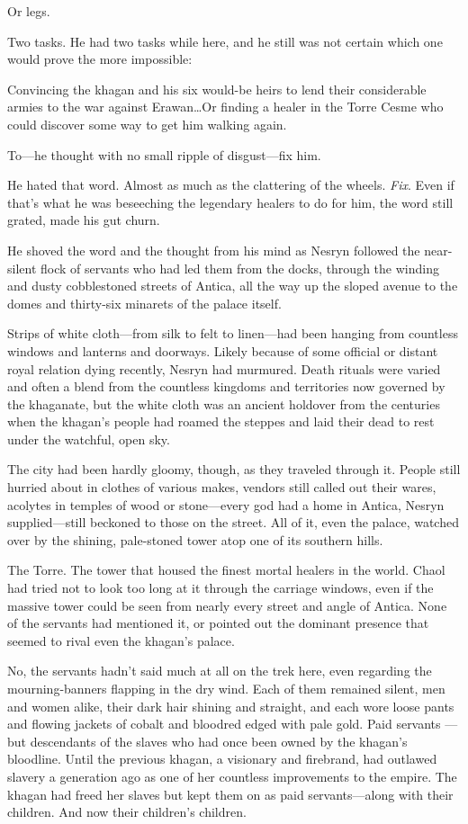 Or legs.

Two tasks.
He had two tasks while here, and he still was not certain which one would prove the more impossible:

Convincing the khagan and his six would-be heirs to lend their considerable armies to the war against Erawan\ldots Or finding a healer in the Torre Cesme who could discover some way to get him walking again.

To---he thought with no small ripple of disgust---fix him.

He hated that word.
Almost as much as the clattering of the wheels.
\emph{Fix}.
Even if that's what he was beseeching the legendary healers to do for him, the word still grated, made his gut churn.

He shoved the word and the thought from his mind as Nesryn followed the near-silent flock of servants who had led them from the docks, through the winding and dusty cobblestoned streets of Antica, all the way up the sloped avenue to the domes and thirty-six minarets of the palace itself.

Strips of white cloth---from silk to felt to linen---had been hanging from countless windows and lanterns and doorways.
Likely because of some official or distant royal relation dying recently, Nesryn had murmured.
Death rituals were varied and often a blend from the countless kingdoms and territories now governed by the khaganate, but the white cloth was an ancient holdover from the centuries when the khagan's people had roamed the steppes and laid their dead to rest under the watchful, open sky.

The city had been hardly gloomy, though, as they traveled through it.
People still hurried about in clothes of various makes, vendors still called out their wares, acolytes in temples of wood or stone---every god had a home in Antica, Nesryn supplied---still beckoned to those on the street.
All of it, even the palace, watched over by the shining, pale-stoned tower atop one of its southern hills.

The Torre.
The tower that housed the finest mortal healers in the world.
Chaol had tried not to look too long at it through the carriage windows, even if the massive tower could be seen from nearly every street and angle of Antica.
None of the servants had mentioned it, or pointed out the dominant presence that seemed to rival even the khagan's palace.

No, the servants hadn't said much at all on the trek here, even regarding the mourning-banners flapping in the dry wind.
Each of them remained silent, men and women alike, their dark hair shining and straight, and each wore loose pants and flowing jackets of cobalt and bloodred edged with pale gold.
Paid servants ---but descendants of the slaves who had once been owned by the khagan's bloodline.
Until the previous khagan, a visionary and firebrand, had outlawed slavery a generation ago as one of her countless improvements to the empire.
The khagan had freed her slaves but kept them on as paid servants---along with their children.
And now their children's children.

